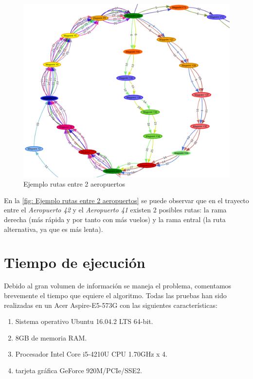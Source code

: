 \begin{figure}[H]
	\begin{center}
		\centering
		\includegraphics[width=1\textwidth]{./imagenes/resultados/representacionGrafica.png}
		\caption{Ejemplo rutas entre 2 aeropuertos}
		\label{fig: Ejemplo rutas entre 2 aeropuertos}
	\end{center}
\end{figure}

En la \autoref{fig: Ejemplo rutas entre 2 aeropuertos} se puede observar que en el trayecto entre el \textit{Aeropuerto 42} y el \textit{Aeropuerto 41} existen 2 posibles rutas: la rama derecha (más rápida y por tanto con más vuelos) y la rama entral (la ruta alternativa, ya que es más lenta).

\section{Tiempo de ejecución}
Debido al gran volumen de información se maneja el problema, comentamos brevemente el tiempo que equiere el algoritmo. Todas las pruebas han sido realizadas en un Acer Aspire-E5-573G con las siguientes características:
\begin{enumerate}
	\item Sistema operativo Ubuntu 16.04.2 LTS 64-bit.
	\item 8GB de memoria RAM.
	\item Procesador Intel Core i5-4210U CPU 1.70GHz x 4.
	\item tarjeta gráfica GeForce 920M/PCIe/SSE2.
\end{enumerate}


